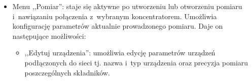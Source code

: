 \begin{itemize}
\begin{itemize}
\item ,,Edytuj obiekty'': umożliwia edycję obiektów będących przedmiotem pomiaru (Rys.~\ref{editObject}).

\begin{figure}[!htb]
\centering 		
  \hspace{2mm}
\caption{Okno edycji obiektów} 	
\label{editObject}
\end{figure}

\end{itemize}
\item Menu ,,Pomiar'': staje się aktywne po utworzeniu lub otworzeniu pomiaru i~nawiązaniu połączenia z~wybranym koncentratorem. Umożliwia konfigurację parametrów aktualnie prowadzonego pomiaru. Daje on następujące możliwości:
\begin{itemize}
\item ,,Edytuj urządzenia'': umożliwia edycję parametrów urządzeń podłączonych do sieci tj. nazwa i~typ urządzenia oraz precyzja pomiaru poszczególnych składników.



\end{itemize}
\end{itemize}
